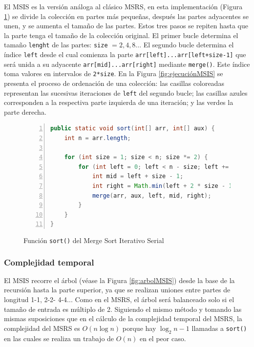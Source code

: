 \documentclass[titlepage]{article}
\begin{document}
El MSIS es la versión análoga al clásico MSRS, en esta implementación (Figura \ref{fig:MSIS_sort()}) se divide la colección en partes más pequeñas, después las partes adyacentes se unen, y se aumenta el tamaño  de las partes. Estos tres pasos se repiten hasta que la parte tenga el tamaño de la colección original. El primer bucle determina el tamaño \lstinline{lenght} de las partes: \lstinline{size} \(=2, 4, 8..\). El segundo bucle determina el índice \lstinline{left} desde el cual comienza la parte \lstinline{arr[left]...arr[left+size-1]} que será unida a su adyacente \lstinline{arr[mid]...arr[right]} mediante \lstinline{merge()}. Este índice toma valores en intervalos de \lstinline{2*size}. En la Figura \ref{fig:ejecuciónMSIS} se presenta el proceso de ordenación de una colección: las casillas coloreadas representan las sucesivas iteraciones de \lstinline{left} del segundo bucle; las casillas azules corresponden a la respectiva parte izquierda de una iteración; y las verdes la parte derecha.

\begin{figure}[hbtp]
    \begin{lstlisting}[language=java, frame=single, numbers=left]
public static void sort(int[] arr, int[] aux) {
	int n = arr.length;
	
	for (int size = 1; size < n; size *= 2) {
		for (int left = 0; left < n - size; left += 2 * size) {
			int mid = left + size - 1;
			int right = Math.min(left + 2 * size - 1, n - 1);
			merge(arr, aux, left, mid, right);
		}
	}
}
    \end{lstlisting}
    \caption{Función \lstinline{sort()} del Merge Sort Iterativo Serial}
    \label{fig:MSIS_sort()}
\end{figure}

\subsubsection{Complejidad temporal}%
El MSIS recorre el árbol (véase la Figura \ref{fig:arbolMSIS}) desde la base de la recursión hasta la parte superior, ya que se realizan uniones entre partes de longitud 1-1, 2-2- 4-4... Como en el MSRS, el árbol será balanceado solo si el tamaño de entrada es múltiplo de 2. Siguiendo el mismo método y tomando las mismas suposiciones que en el cálculo de la complejidad temporal del MSRS, la complejidad del MSRS es \(O(n \log{n})\) porque hay \(\log_2{n}-1\) llamadas a \lstinline|sort()| en las cuales se realiza un trabajo de \(O(n)\) en el peor caso.
\end{document}
